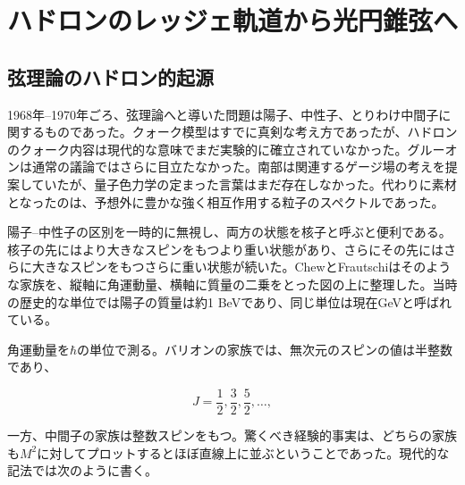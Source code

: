 \chapter{ハドロンのレッジェ軌道から光円錐弦へ}


\section{弦理論のハドロン的起源}

1968年--1970年ごろ、弦理論へと導いた問題は陽子、中性子、とりわけ中間子に関するものであった。クォーク模型はすでに真剣な考え方であったが、ハドロンのクォーク内容は現代的な意味でまだ実験的に確立されていなかった。グルーオンは通常の議論ではさらに目立たなかった。南部は関連するゲージ場の考えを提案していたが、量子色力学の定まった言葉はまだ存在しなかった。代わりに素材となったのは、予想外に豊かな強く相互作用する粒子のスペクトルであった。

陽子--中性子の区別を一時的に無視し、両方の状態を核子と呼ぶと便利である。核子の先にはより大きなスピンをもつより重い状態があり、さらにその先にはさらに大きなスピンをもつさらに重い状態が続いた。ChewとFrautschiはそのような家族を、縦軸に角運動量、横軸に質量の二乗をとった図の上に整理した。当時の歴史的な単位では陽子の質量は約1 BeVであり、同じ単位は現在GeVと呼ばれている。

角運動量を\(\hbar\)の単位で測る。バリオンの家族では、無次元のスピンの値は半整数であり、

\begin{equation}
  J=\frac12,\frac32,\frac52,\ldots,
\end{equation}

一方、中間子の家族は整数スピンをもつ。驚くべき経験的事実は、どちらの家族も\(M^2\)に対してプロットするとほぼ直線上に並ぶということであった。現代的な記法では次のように書く。


